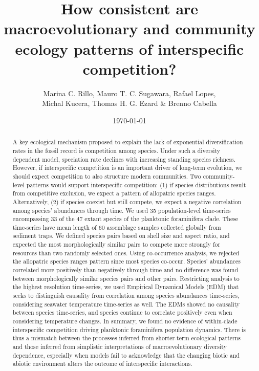 \documentclass[a4paper]{article}
\title{How consistent are macroevolutionary and community ecology patterns of interspecific competition?}
\author{Marina C. Rillo, Mauro T. C. Sugawara, Rafael Lopes, \\ Michal Kucera, Thomas H. G. Ezard \& Brenno Cabella}
\date{\today}
\begin{document}
\maketitle

\begin{abstract}

A key ecological mechanism proposed to explain the lack of exponential diversification rates in the fossil record is competition among species. Under such a diversity dependent model, speciation rate declines with increasing standing species richness. However, if interspecific competition is an important driver of long-term evolution, we should expect competition to also structure modern communities. Two community-level patterns would support interspecific competition: (1) if species distributions result from competitive exclusion, we expect a pattern of allopatric species ranges. Alternatively, (2) if species coexist but still compete, we expect a negative correlation among species’ abundances through time. We used 35 population-level time-series encompassing 33 of the 47 extant species of the planktonic foraminifera clade. These time-series have mean length of 60 assemblage samples collected globally from sediment traps. We defined species pairs based on shell size and aspect ratio, and expected the most morphologically similar pairs to compete more strongly for resources than two randomly selected ones. Using co-occurrence analysis, we rejected the allopatric species ranges pattern since most species co-occur. Species’ abundances correlated more positively than negatively through time and no difference was found between morphologically similar species pairs and other pairs. Restricting analysis to the highest resolution time-series, we used Empirical Dynamical Models (EDM) that seeks to distinguish causality from correlation among species abundances time-series, considering seawater temperature time-series as well. The EDMs showed no causality between species time-series, and species continue to correlate positively even when considering temperature changes. In summary, we found no evidence of within-clade interspecific competition driving planktonic foraminifera population dynamics.  There is thus a mismatch between the processes inferred from shorter-term ecological patterns and those inferred from simplistic interpretations of macroevolutionary diversity dependence, especially when models fail to acknowledge that the changing biotic and abiotic environment alters the outcome of interspecific interactions.

\end{abstract}
\end{document}
